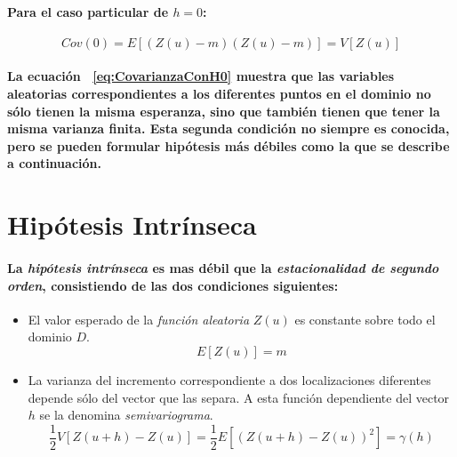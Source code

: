 \paragraph{
Para el caso particular de $h = 0$:
}
\begin{equation}
\label{eq:CasoParticularDeEstacionalidadDeSegundoOrden}
Cov(0) =  E[(Z(u)-m)(Z(u)-m)] = V[Z(u)]
\label{eq:CovarianzaConH0}
\end{equation}
\paragraph{
La ecuación ~\ref{eq:CovarianzaConH0} muestra que las variables aleatorias correspondientes a los diferentes puntos en el dominio no sólo tienen la misma esperanza, sino que también tienen que tener la misma varianza finita. Esta segunda condición no siempre es conocida, pero se pueden formular hipótesis más débiles como la que se describe a continuación.
}



\section{Hipótesis Intrínseca}
\paragraph{
La \emph{hipótesis intrínseca} es mas débil que la \emph{estacionalidad de segundo orden}, consistiendo de las dos condiciones siguientes:
}
\begin{itemize}
\item El valor esperado de la \emph{función aleatoria} $Z(u)$ es constante sobre todo el dominio $D$.
\begin{equation}
\label{eq:PrimeraCondicionDeLaHipotesisIntrinseca}
E[Z(u)] = m
\end{equation}
\item La varianza del incremento correspondiente a dos localizaciones diferentes depende sólo del vector que las separa. A esta función dependiente del vector $h$ se la denomina \emph{semivariograma}\footnotemark[11].
\begin{equation}
\frac{1}{2}V[Z(u+h)-Z(u)]=\frac{1}{2}E[(Z(u+h)-Z(u))^2] = \gamma(h)
\label{eq:Semivariograma}
\end{equation}
\end{itemize}
